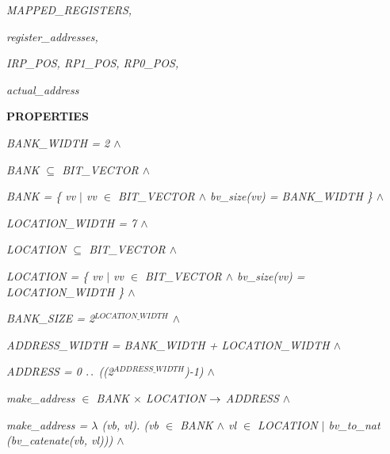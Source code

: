 \begin{sloppypar}
\vspace*{4mm}
\hspace*{0.20in}\it MAPPED\_REGISTERS\rm ,

\hspace*{0.20in}\it register\_addresses\rm ,

\vspace*{4mm}
\hspace*{0.20in}\it IRP\_POS\rm , \it RP1\_POS\rm , \it RP0\_POS\rm ,

\vspace*{4mm}
\hspace*{0.20in}\it actual\_address

\vspace*{4mm}
\bf PROPERTIES

\hspace*{0.20in}\it BANK\_WIDTH \rm = \rm 2  $\land$ 

\hspace*{0.20in}\it BANK  $\subseteq$  \it BIT\_VECTOR  $\land$ 

\hspace*{0.20in}\it BANK \rm = \rm \{ \it vv  $\mid$  \it vv  $\in$  \it BIT\_VECTOR  $\land$  \it bv\_size\rm (\it vv\rm ) \rm = \it BANK\_WIDTH \rm \}  $\land$ 

\hspace*{0.20in}\it LOCATION\_WIDTH \rm = \rm 7  $\land$ 

\hspace*{0.20in}\it LOCATION  $\subseteq$  \it BIT\_VECTOR  $\land$ 

\hspace*{0.20in}\it LOCATION \rm = \rm \{ \it vv  $\mid$  \it vv  $\in$  \it BIT\_VECTOR  $\land$  \it bv\_size\rm (\it vv\rm ) \rm = \it LOCATION\_WIDTH \rm \}  $\land$ 

\hspace*{0.20in}\it BANK\_SIZE \rm = \rm 2$^{LOCATION\_WIDTH}$  $\land$ 

\hspace*{0.20in}\it ADDRESS\_WIDTH \rm = \it BANK\_WIDTH \rm + \it LOCATION\_WIDTH  $\land$ 

\hspace*{0.20in}\it ADDRESS \rm = \rm 0 $\mathbin{\ldotp\ldotp}$ \rm (\rm (\rm 2$^{ADDRESS\_WIDTH}$\rm )\rm -\rm 1\rm )  $\land$ 

\hspace*{0.20in}\it make\_address  $\in$  \it BANK  $\times$  \it LOCATION  $\rightarrow$  \it ADDRESS  $\land$ 

\hspace*{0.20in}\it make\_address \rm =  $\lambda$ \rm (\it vb\rm , \it vl\rm )\rm . \rm (\it vb  $\in$  \it BANK  $\land$  \it vl  $\in$  \it LOCATION  $\mid$  \it bv\_to\_nat \rm (\it bv\_catenate\rm (\it vb\rm , \it vl\rm )\rm )\rm )  $\land$ 


\end{sloppypar}
